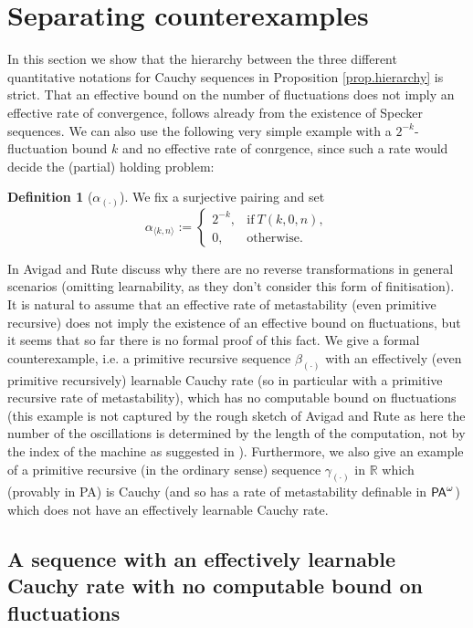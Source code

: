 \documentclass[1p]{elsarticle}
\newcommand{\usftext}[1]{\textsf{\upshape #1}}
\newcommand{\RR}{\ensuremath{\mathbb{R}}}
\newcommand{\pa}{\ensuremath{{\usftext{PA}}^\omega}} %
\newcommand{\Tif}{\text{if}\ }
\newcommand{\Telse}{\text{otherwise}}
\theoremstyle{plain}
\theoremstyle{definition}
\newtheorem{dfn}[thm]{Definition}
\theoremstyle{remark}
\theoremstyle{definition}
\begin{document}
{\section{Separating counterexamples}
In this section we show that the hierarchy between the three different 
quantitative notations for Cauchy sequences in Proposition 
\ref{prop.hierarchy} is strict. That an effective bound on the number of fluctuations does not imply an 
effective rate of convergence, follows already from the existence of Specker sequences. We can also use the following
very simple example with a $2^{-k}$-fluctuation bound $k$ and no effective rate of conrgence, since such a rate would decide the (partial) holding problem:\\ 
\begin{dfn}[$\alpha_{(\cdot)}$] 
We fix a surjective pairing and set
\[
\alpha_{\langle k,n\rangle}:=
\begin{cases}
2^{-k}, &\Tif T(k,0,n),\\
0, &\Telse.
\end{cases}
\]
\end{dfn}
In \cite{Avigad/Rute} Avigad and Rute discuss why there are no reverse transformations in general scenarios (omitting learnability, as they don't consider this form of finitisation). It is natural to assume that an effective rate of metastability (even primitive recursive) does not imply the existence of an effective bound on fluctuations, but it seems that so far there is no formal proof of this fact.
We give a formal counterexample, i.e. a primitive recursive sequence $\beta_{(\cdot)}$ with an effectively (even primitive recursively) learnable Cauchy rate (so in particular with a primitive recursive rate of metastability), which has no computable bound on fluctuations (this example is not captured by the rough sketch of Avigad and Rute as here the number of the oscillations is determined by the length of the computation, not by the index of the machine as suggested in \cite{Avigad/Rute}). %
Furthermore, we also give an example of a primitive recursive (in the ordinary 
sense) sequence $\gamma_{(\cdot)}$ in $\RR$ which (provably in PA) is Cauchy (and so 
has a rate of metastability definable in $\pa$) 
which does not have an effectively learnable Cauchy rate. 

\subsection{A sequence with an effectively learnable Cauchy rate with no computable bound on fluctuations}

}
\end{document}

